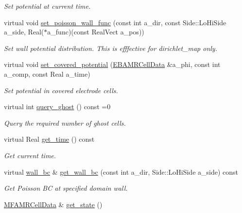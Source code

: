 \begin{DoxyCompactItemize}
\begin{DoxyCompactList}\small\item\em Set potential at current time. \end{DoxyCompactList}\item 
virtual void \hyperlink{classpoisson__solver_ad269e311264eea9769f9d7175341b8a0}{set\+\_\+poisson\+\_\+wall\+\_\+func} (const int a\+\_\+dir, const Side\+::\+Lo\+Hi\+Side a\+\_\+side, Real($\ast$a\+\_\+func)(const Real\+Vect a\+\_\+pos))
\begin{DoxyCompactList}\small\item\em Set wall potential distribution. This is efffective for dirichlet\+\_\+map only. \end{DoxyCompactList}\item 
virtual void \hyperlink{classpoisson__solver_afeaf3f24c67d1b68e7d308e9f3c5a882}{set\+\_\+covered\+\_\+potential} (\hyperlink{type__definitions_8H_a7e610f301989e5e07781c5e338bdb7c3}{E\+B\+A\+M\+R\+Cell\+Data} \&a\+\_\+phi, const int a\+\_\+comp, const Real a\+\_\+time)
\begin{DoxyCompactList}\small\item\em Set potential in covered electrode cells. \end{DoxyCompactList}\item 
virtual int \hyperlink{classpoisson__solver_a44ea16773ef8b62ae504e8d215e48bc0}{query\+\_\+ghost} () const =0
\begin{DoxyCompactList}\small\item\em Query the required number of ghost cells. \end{DoxyCompactList}\item 
virtual Real \hyperlink{classpoisson__solver_a6b3ee88b44c3c2d70fd3230d12f813fc}{get\+\_\+time} () const 
\begin{DoxyCompactList}\small\item\em Get current time. \end{DoxyCompactList}\item 
virtual \hyperlink{classwall__bc}{wall\+\_\+bc} \& \hyperlink{classpoisson__solver_a113ae20f8f065c666c9782b05798049f}{get\+\_\+wall\+\_\+bc} (const int a\+\_\+dir, Side\+::\+Lo\+Hi\+Side a\+\_\+side) const 
\begin{DoxyCompactList}\small\item\em Get Poisson BC at specified domain wall. \end{DoxyCompactList}\item 
\hyperlink{type__definitions_8H_aced885351d40daa466564acbee4042d3}{M\+F\+A\+M\+R\+Cell\+Data} \& \hyperlink{classpoisson__solver_a2dd2686e7aeb7a62f212ce4479d7bac1}{get\+\_\+state} ()

\end{DoxyCompactItemize}
